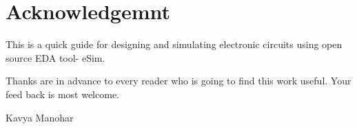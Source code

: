 \chapter*{Acknowledgemnt}

This is a quick guide for designing and simulating electronic circuits using open source  EDA tool- eSim. 


Thanks are in advance to every reader who is going to find this work useful. Your feed back is most welcome.

\begin{flushright} Kavya Manohar \end{flushright}